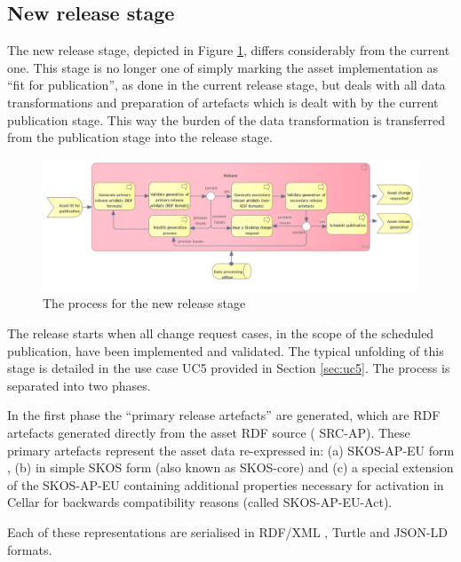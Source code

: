 	\subsection{New release stage}
	\label{sec:release-new}
	
	The new release stage, depicted in Figure \ref{fig:release-new}, differs considerably from the current one. This stage is no longer one of simply marking the asset implementation as ``fit for publication'', as done in the current release stage, but deals with all data transformations and preparation of artefacts which is dealt with by the current publication stage. This way the burden of the data transformation is transferred from the publication stage into the release stage.
	
	\begin{figure}[h]
		\centering
		\includegraphics[width=1.05\textwidth]{images/business/new/Release.png}
		\caption{The process for the new release stage}
		\label{fig:release-new}
	\end{figure}

	The release starts when all change request cases, in the scope of the scheduled publication, have been implemented and validated. The typical unfolding of this stage is detailed in the use case UC5 provided in Section \ref{sec:uc5}. The process is separated into two phases.
	
	In the first phase the ``primary release artefacts'' are generated, which are RDF artefacts generated directly from the asset RDF source ( SRC-AP\citep{src-ap-vb3}). These primary artefacts represent the asset data re-expressed in: (a) SKOS-AP-EU form \citep{skos-ap-eu}, (b) in simple SKOS\citep{skos-spec} form (also known as SKOS-core) and (c) a special extension of the SKOS-AP-EU containing additional properties necessary for activation in Cellar for backwards compatibility reasons (called SKOS-AP-EU-Act). 
	
	\enlargethispage{3em}
	
	Each of these representations are serialised in RDF/XML \citep{rdf-xml-Schreiber:14:RXS,rdf-xml-Beckett:04:RSS}, Turtle \citep{turtle-Carothers:14:RT} and JSON-LD \citep{sporny2014json,spornyjson} formats. 
	
